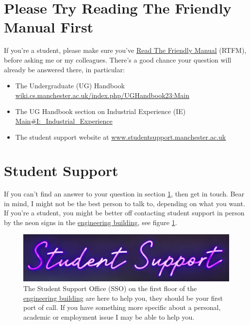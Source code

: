 \documentclass[
  12pt,
]{book}
\providecommand{\tightlist}{%
  \setlength{\itemsep}{0pt}\setlength{\parskip}{0pt}}
\begin{document}
\hypertarget{rtfm}{%
\section{Please Try Reading The Friendly Manual First}\label{rtfm}}

If you're a student, please make sure you've \href{https://en.wikipedia.org/wiki/RTFM}{Read The Friendly Manual} (RTFM), before asking me or my colleagues. There's a good chance your question will already be answered there, in particular:

\begin{itemize}
\tightlist
\item
  The Undergraduate (UG) Handbook \href{https://wiki.cs.manchester.ac.uk/index.php/UGHandbook23:Main}{wiki.cs.manchester.ac.uk/index.php/UGHandbook23:Main}
\item
  The UG Handbook section on Industrial Experience (IE) \href{https://wiki.cs.manchester.ac.uk/index.php/UGHandbook23:Main\#I:_Industrial_Experience}{Main\#I:\_Industrial\_Experience}
\item
  The student support website at \href{https://www.studentsupport.manchester.ac.uk/}{www.studentsupport.manchester.ac.uk}
\end{itemize}

\hypertarget{sso}{%
\section{Student Support}\label{sso}}

If you can't find an answer to your question in section \ref{rtfm}, then get in touch. Bear in mind, I might not be the best person to talk to, depending on what you want. If you're a student, you might be better off contacting student support in person by the neon signs in the \href{https://www.mecd.manchester.ac.uk/}{engineering building}, see figure \ref{fig:sso-fig}.

\begin{figure}

{\centering \includegraphics[width=1\linewidth]{images/studentsupport} 

}

\caption{The Student Support Office (SSO) on the first floor of the \href{https://www.mecd.manchester.ac.uk/}{engineering building} are here to help you, they should be your first port of call. If you have something more specific about a personal, academic or employment issue I may be able to help you.}\label{fig:sso-fig}
\end{figure}
\end{document}
